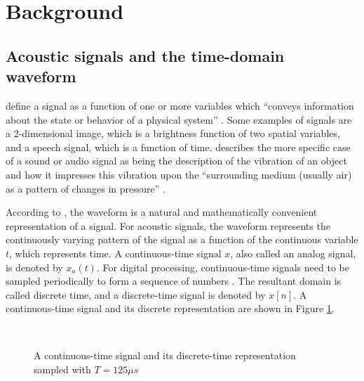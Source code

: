 \documentclass[report.tex]{subfiles}
\begin{document}
\section{Background}
\label{sec:background}

\subsection{Acoustic signals and the time-domain waveform}
\label{sec:timedomain}

\citeauthor{discretebook} define a signal as a function of one or more variables which ``conveys information about the state or behavior of a physical system'' \parencite[8]{discretebook}. Some examples of signals are a 2-dimensional image, which is a brightness function of two spatial variables, and a speech signal, which is a function of time. \citeauthor{moore} describes the more specific case of a sound or audio signal as being the description of the vibration of an object and how it impresses this vibration upon the ``surrounding medium (usually air) as a pattern of changes in pressure'' \parencite[2]{moore}.

According to \textcite{melbook}, the waveform is a natural and mathematically convenient representation of a signal. For acoustic signals, the waveform represents the continuously varying pattern of the signal as a function of the continuous variable $t$, which represents time. A continuous-time signal $x$, also called an analog signal, is denoted by $x_{a}(t)$. For digital processing, continuous-time signals need to be sampled periodically to form a sequence of numbers \parencite{discretebook}. The resultant domain is called discrete time, and a discrete-time signal is denoted by $x[n]$.  A continuous-time signal and its discrete representation are shown in Figure \ref{fig:discretecontinuous}.

\begin{figure}[ht]
	\centering
	\\
	\caption{A continuous-time signal and its discrete-time representation sampled with $T = 125\mu s$ \parencite[10]{discretebook}}
	\label{fig:discretecontinuous}
\end{figure}
\end{document}
